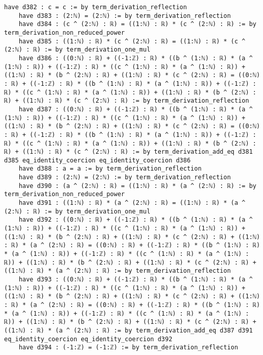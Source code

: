 \documentclass{article}
\begin{document}
\begin{tcolorbox}[colback=white!10, width=\linewidth]
\begin{lstlisting}[language=Lean4]
    have d382 : c = c := by term_derivation_reflection
    have d383 : (2:ℕ) = (2:ℕ) := by term_derivation_reflection
    have d384 : (c ^ (2:ℕ) : ℝ) = ((1:ℕ) : ℝ) * (c ^ (2:ℕ) : ℝ) := by term_derivation_non_reduced_power
    have d385 : ((1:ℕ) : ℝ) * (c ^ (2:ℕ) : ℝ) = ((1:ℕ) : ℝ) * (c ^ (2:ℕ) : ℝ) := by term_derivation_one_mul
    have d386 : ((0:ℕ) : ℝ) + ((-1:ℤ) : ℝ) * ((b ^ (1:ℕ) : ℝ) * (a ^ (1:ℕ) : ℝ)) + ((-1:ℤ) : ℝ) * ((c ^ (1:ℕ) : ℝ) * (a ^ (1:ℕ) : ℝ)) + ((1:ℕ) : ℝ) * (b ^ (2:ℕ) : ℝ) + ((1:ℕ) : ℝ) * (c ^ (2:ℕ) : ℝ) = ((0:ℕ) : ℝ) + ((-1:ℤ) : ℝ) * ((b ^ (1:ℕ) : ℝ) * (a ^ (1:ℕ) : ℝ)) + ((-1:ℤ) : ℝ) * ((c ^ (1:ℕ) : ℝ) * (a ^ (1:ℕ) : ℝ)) + ((1:ℕ) : ℝ) * (b ^ (2:ℕ) : ℝ) + ((1:ℕ) : ℝ) * (c ^ (2:ℕ) : ℝ) := by term_derivation_reflection
    have d387 : ((0:ℕ) : ℝ) + ((-1:ℤ) : ℝ) * ((b ^ (1:ℕ) : ℝ) * (a ^ (1:ℕ) : ℝ)) + ((-1:ℤ) : ℝ) * ((c ^ (1:ℕ) : ℝ) * (a ^ (1:ℕ) : ℝ)) + ((1:ℕ) : ℝ) * (b ^ (2:ℕ) : ℝ) + ((1:ℕ) : ℝ) * (c ^ (2:ℕ) : ℝ) = ((0:ℕ) : ℝ) + ((-1:ℤ) : ℝ) * ((b ^ (1:ℕ) : ℝ) * (a ^ (1:ℕ) : ℝ)) + ((-1:ℤ) : ℝ) * ((c ^ (1:ℕ) : ℝ) * (a ^ (1:ℕ) : ℝ)) + ((1:ℕ) : ℝ) * (b ^ (2:ℕ) : ℝ) + ((1:ℕ) : ℝ) * (c ^ (2:ℕ) : ℝ) := by term_derivation_add_eq d381 d385 eq_identity_coercion eq_identity_coercion d386
    have d388 : a = a := by term_derivation_reflection
    have d389 : (2:ℕ) = (2:ℕ) := by term_derivation_reflection
    have d390 : (a ^ (2:ℕ) : ℝ) = ((1:ℕ) : ℝ) * (a ^ (2:ℕ) : ℝ) := by term_derivation_non_reduced_power
    have d391 : ((1:ℕ) : ℝ) * (a ^ (2:ℕ) : ℝ) = ((1:ℕ) : ℝ) * (a ^ (2:ℕ) : ℝ) := by term_derivation_one_mul
    have d392 : ((0:ℕ) : ℝ) + ((-1:ℤ) : ℝ) * ((b ^ (1:ℕ) : ℝ) * (a ^ (1:ℕ) : ℝ)) + ((-1:ℤ) : ℝ) * ((c ^ (1:ℕ) : ℝ) * (a ^ (1:ℕ) : ℝ)) + ((1:ℕ) : ℝ) * (b ^ (2:ℕ) : ℝ) + ((1:ℕ) : ℝ) * (c ^ (2:ℕ) : ℝ) + ((1:ℕ) : ℝ) * (a ^ (2:ℕ) : ℝ) = ((0:ℕ) : ℝ) + ((-1:ℤ) : ℝ) * ((b ^ (1:ℕ) : ℝ) * (a ^ (1:ℕ) : ℝ)) + ((-1:ℤ) : ℝ) * ((c ^ (1:ℕ) : ℝ) * (a ^ (1:ℕ) : ℝ)) + ((1:ℕ) : ℝ) * (b ^ (2:ℕ) : ℝ) + ((1:ℕ) : ℝ) * (c ^ (2:ℕ) : ℝ) + ((1:ℕ) : ℝ) * (a ^ (2:ℕ) : ℝ) := by term_derivation_reflection
    have d393 : ((0:ℕ) : ℝ) + ((-1:ℤ) : ℝ) * ((b ^ (1:ℕ) : ℝ) * (a ^ (1:ℕ) : ℝ)) + ((-1:ℤ) : ℝ) * ((c ^ (1:ℕ) : ℝ) * (a ^ (1:ℕ) : ℝ)) + ((1:ℕ) : ℝ) * (b ^ (2:ℕ) : ℝ) + ((1:ℕ) : ℝ) * (c ^ (2:ℕ) : ℝ) + ((1:ℕ) : ℝ) * (a ^ (2:ℕ) : ℝ) = ((0:ℕ) : ℝ) + ((-1:ℤ) : ℝ) * ((b ^ (1:ℕ) : ℝ) * (a ^ (1:ℕ) : ℝ)) + ((-1:ℤ) : ℝ) * ((c ^ (1:ℕ) : ℝ) * (a ^ (1:ℕ) : ℝ)) + ((1:ℕ) : ℝ) * (b ^ (2:ℕ) : ℝ) + ((1:ℕ) : ℝ) * (c ^ (2:ℕ) : ℝ) + ((1:ℕ) : ℝ) * (a ^ (2:ℕ) : ℝ) := by term_derivation_add_eq d387 d391 eq_identity_coercion eq_identity_coercion d392
    have d394 : (-1:ℤ) = (-1:ℤ) := by term_derivation_reflection

\end{lstlisting}
\end{tcolorbox}
\end{document}
